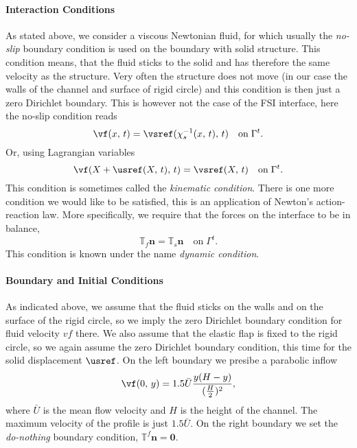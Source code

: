 \paragraph{Interaction Conditions}
As stated above, we consider a viscous Newtonian fluid, for which usually the \emph{no-slip} 
boundary condition is used on the boundary with solid structure. This condition means, that
the fluid sticks to the solid and has therefore the same velocity as the structure.
Very often the structure does not move (in our case the walls of the channel and surface
of rigid circle) and this condition is then just a zero Dirichlet boundary. This is however
not the case of the FSI interface, here the no-slip condition reads
\begin{equation}
\vf(x,\,t) = \vsref(\chi_s^{-1}(x,\,t),\,t) \quad\mathrm{on}\;\Gamma^t.
\end{equation}
Or, using Lagrangian variables
\begin{equation}
\vf(X + \usref(X,\,t),\,t) = \vsref(X,\,t) \quad \mathrm{on}\;\Gamma^t.
\end{equation}
This condition is sometimes called the \emph{kinematic condition}.
There is one more condition we would like to be satisfied, this is an application of Newton's
action-reaction law. More specifically, we require that the forces on the interface to be in balance,
\begin{equation}
  \mathbb{T}_f\mathbf{n} = \mathbb{T}_s\mathbf{n}\quad\mathrm{on}\;\Gamma^t.
\end{equation}
This condition is known under the name \emph{dynamic condition}.



\paragraph{Boundary and Initial Conditions}
As indicated above, we assume that the fluid sticks on the walls and on the surface of the rigid 
circle, so we imply the zero Dirichlet boundary condition for fluid velocity $vf$ there. 
We also assume that the elastic flap is fixed to the rigid circle, so we again assume the 
zero Dirichlet boundary condition, this time for the solid displacement $\usref$.
On the left boundary we presibe a parabolic inflow 
\begin{equation}\label{eq:steady_profile}
  \vf(0, \,y) = 1.5\bar{U}\frac{y(H-y)}{(\frac{H}{2})^2},
\end{equation}
where $\bar{U}$ is the mean flow velocity and $H$ is the height of the channel.
The maximum velocity of the profile is just $1.5\bar{U}$.
On the right boundary we set the
\emph{do-nothing} boundary condition, $\mathbb{T}^f\mathbf{n} = \mathbf{0}$.

